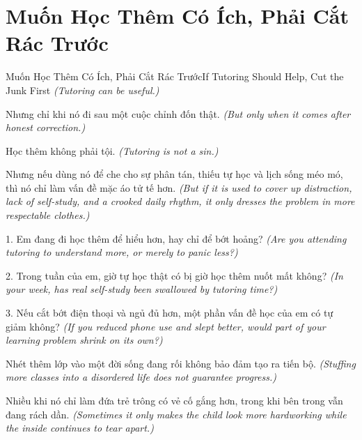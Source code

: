 \section{Muốn Học Thêm Có Ích, Phải Cắt Rác Trước}
\begin{truyen}{Muốn Học Thêm Có Ích, Phải Cắt Rác Trước}{If Tutoring Should Help, Cut the Junk First}
\textit{(Tutoring can be useful.)}

Nhưng chỉ khi nó đi sau một cuộc chỉnh đốn thật.
\textit{(But only when it comes after honest correction.)}

\end{truyen}

\begin{baihoc}
Học thêm không phải tội.
\textit{(Tutoring is not a sin.)}

Nhưng nếu dùng nó để che cho sự phân tán, thiếu tự học và lịch sống méo mó, thì nó chỉ làm vấn đề mặc áo tử tế hơn.
\textit{(But if it is used to cover up distraction, lack of self-study, and a crooked daily rhythm, it only dresses the problem in more respectable clothes.)}
\end{baihoc}

\begin{tuhocnhanh}
1. Em đang đi học thêm để hiểu hơn, hay chỉ để bớt hoảng? \textit{(Are you attending tutoring to understand more, or merely to panic less?)}

2. Trong tuần của em, giờ tự học thật có bị giờ học thêm nuốt mất không? \textit{(In your week, has real self-study been swallowed by tutoring time?)}

3. Nếu cắt bớt điện thoại và ngủ đủ hơn, một phần vấn đề học của em có tự giảm không? \textit{(If you reduced phone use and slept better, would part of your learning problem shrink on its own?)}
\end{tuhocnhanh}

\begin{tongketchuong}
Nhét thêm lớp vào một đời sống đang rối không bảo đảm tạo ra tiến bộ.
\textit{(Stuffing more classes into a disordered life does not guarantee progress.)}

Nhiều khi nó chỉ làm đứa trẻ trông có vẻ cố gắng hơn, trong khi bên trong vẫn đang rách dần.
\textit{(Sometimes it only makes the child look more hardworking while the inside continues to tear apart.)}
\end{tongketchuong}

\ngancach